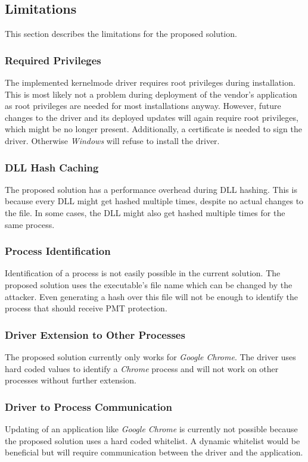 \subsection{Limitations}
This section describes the limitations for the proposed solution.
\subsubsection{Required Privileges}
The implemented kernelmode driver requires root privileges during installation. This is most likely not a problem during deployment of the vendor's application as root privileges are needed for most installations anyway. However, future changes to the driver and its deployed updates will again require root privileges, which might be no longer present. Additionally, a certificate is needed to sign the driver. Otherwise \emph{Windows} will refuse to install the driver.
\subsubsection{DLL Hash Caching}
The proposed solution has a performance overhead during \gls{DLL} hashing. This is because every \gls{DLL} might get hashed multiple times, despite no actual changes to the file. In some cases, the \gls{DLL} might also get hashed multiple times for the same process. 
\subsubsection{Process Identification}
Identification of a process is not easily possible in the current solution. The proposed solution uses the executable's file name which can be changed by the attacker. Even generating a hash over this file will not be enough to identify the process that should receive \gls{PMT} protection. 
\subsubsection{Driver Extension to Other Processes}
The proposed solution currently only works for \emph{Google Chrome}. The driver uses hard coded values to identify a \emph{Chrome} process and will not work on other processes without further extension.
\subsubsection{Driver to Process Communication}
Updating of an application like \emph{Google Chrome} is currently not possible because the proposed solution uses a hard coded whitelist. A dynamic whitelist would be beneficial but will require communication between the driver and the application.